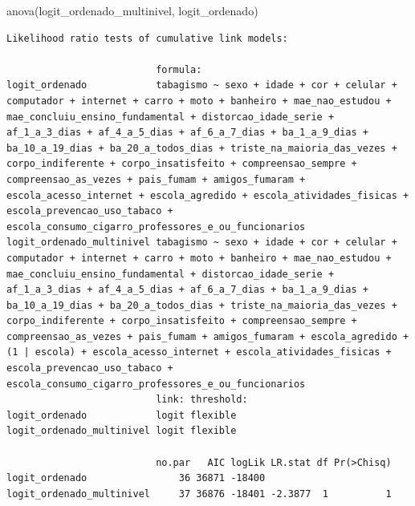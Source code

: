 \documentclass[
]{article}
\newenvironment{Shaded}{\begin{snugshade}}{\end{snugshade}}
\newcommand{\FunctionTok}[1]{\textcolor[rgb]{0.28,0.35,0.67}{#1}}
\newcommand{\NormalTok}[1]{\textcolor[rgb]{0.00,0.23,0.31}{#1}}
\begin{document}
\begin{Shaded}
\begin{Highlighting}[]
\FunctionTok{anova}\NormalTok{(logit\_ordenado\_multinivel, logit\_ordenado)}
\end{Highlighting}
\end{Shaded}

\begin{verbatim}
Likelihood ratio tests of cumulative link models:
 
                          formula:                                                                                                                                                                                                                                                                                                                                                                                                                                                                                                                                                                                                      
logit_ordenado            tabagismo ~ sexo + idade + cor + celular + computador + internet + carro + moto + banheiro + mae_nao_estudou + mae_concluiu_ensino_fundamental + distorcao_idade_serie + af_1_a_3_dias + af_4_a_5_dias + af_6_a_7_dias + ba_1_a_9_dias + ba_10_a_19_dias + ba_20_a_todos_dias + triste_na_maioria_das_vezes + corpo_indiferente + corpo_insatisfeito + compreensao_sempre + compreensao_as_vezes + pais_fumam + amigos_fumaram + escola_acesso_internet + escola_agredido + escola_atividades_fisicas + escola_prevencao_uso_tabaco +      escola_consumo_cigarro_professores_e_ou_funcionarios               
logit_ordenado_multinivel tabagismo ~ sexo + idade + cor + celular + computador + internet + carro + moto + banheiro + mae_nao_estudou + mae_concluiu_ensino_fundamental + distorcao_idade_serie + af_1_a_3_dias + af_4_a_5_dias + af_6_a_7_dias + ba_1_a_9_dias + ba_10_a_19_dias + ba_20_a_todos_dias + triste_na_maioria_das_vezes + corpo_indiferente + corpo_insatisfeito + compreensao_sempre + compreensao_as_vezes + pais_fumam + amigos_fumaram + escola_agredido + (1 | escola) + escola_acesso_internet + escola_atividades_fisicas +      escola_prevencao_uso_tabaco + escola_consumo_cigarro_professores_e_ou_funcionarios
                          link: threshold:
logit_ordenado            logit flexible  
logit_ordenado_multinivel logit flexible  

                          no.par   AIC logLik LR.stat df Pr(>Chisq)
logit_ordenado                36 36871 -18400                      
logit_ordenado_multinivel     37 36876 -18401 -2.3877  1          1
\end{verbatim}
\end{document}
